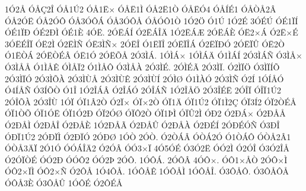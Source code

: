{1^^d32^^c5
^^d3^^c5^^c72^^ce
^^d3^^c51^^da2
^^d3^^c51^^cb^^d7
^^d3^^c5^^cb1^^cc
^^d3^^c52^^cb1^^d2
^^d3^^c5^^cb^^d34
^^d3^^c5^^cd^^c91
^^d3^^c5^^d2^^c52^^c2
^^d3^^c52^^d3^^cb
^^d3^^c52^^d3^^d4
^^d3^^c53^^d3^^d4^^c1
^^d3^^c53^^d3^^d4^^c5
^^d3^^c5^^d3^^d41^^d2
1^^d32^^d6
^^d31^^da
1^^d32^^c9
3^^d3^^c9^^da
^^d3^^c91^^cf^^cd
^^d3^^c91^^cf^^d0
^^d3^^c92^^d0^^cc
^^d3^^c91^^c8
4^^d3^^cb.
2^^d3^^cb^^c1^^cd
^^d32^^cb^^c1^^ce^^c4
1^^d32^^cb^^c1^^c6
2^^d3^^cb^^c1^^c8
^^d3^^cb2^^d7^^c1
^^d32^^cb^^d7^^c9
3^^d3^^cb^^c9^^ce^^cf
^^d3^^cb2^^cc
^^d32^^cb^^cc^^d1
^^d3^^cb3^^cc^^d1^^d7
2^^d3^^cb^^ce
^^d31^^cb^^cf^^ce
2^^d3^^cb^^cf^^ce^^c1
^^d32^^cb^^cf^^d0^^d3
2^^d3^^cb^^cf^^db
^^d3^^cb2^^d2
^^d31^^cb^^d2^^c1
2^^d3^^cb^^d2^^c9^^c2
^^d3^^cb1^^d3
2^^d3^^cb^^d5^^c5
2^^d33^^cc^^c1.
1^^d3^^cc^^c1^^d7
1^^d3^^cc^^c1^^c4
^^d31^^cc^^c1^^cd
2^^d33^^cc^^c1^^d1
^^d33^^cc^^c5^^d7
^^d33^^cc^^c5^^c5
^^d31^^cc^^c5^^ca
^^d3^^cc^^c5^^cf2
^^d31^^cc^^c5^^d4
^^d33^^cc^^c5^^c0
2^^d33^^cc^^c9.
2^^d3^^cc^^c9^^c3
2^^d33^^cc^^cf.
^^d32^^cc^^cf^^d6
^^d33^^cc^^cf^^cd^^d5
2^^d33^^cc^^cf^^d3
2^^d33^^cc^^d5^^c0
2^^d33^^cc^^d9^^c5
2^^d33^^cc^^d9^^ca
2^^d33^^cc^^d9^^cd
2^^d3^^cc^^d8
^^d31^^cc^^c0^^d3
2^^d33^^cc^^d1
^^d32^^cd
1^^d3^^cd^^c5^^d3
^^d34^^cd^^c5^^d1
^^d33^^cd^^d5^^d2
^^d31^^ce
1^^d32^^ce^^c1^^c2
^^d32^^ce^^c1^^d3
2^^d3^^ce^^c1^^d1
1^^d32^^ce^^c5^^d6
2^^d33^^ce^^c9^^cb
2^^d3^^ce^^cf
^^d3^^ce^^cf1^^da2
2^^d3^^ce^^d5^^c0
2^^d33^^ce^^d9
1^^d3^^cf
^^d3^^cf1^^c22^^d2
^^d32^^cf^^d7
^^d3^^cf^^d72^^d2
^^d3^^cf1^^c4
^^d3^^cf1^^da2
^^d3^^cf1^^cc2^^c7
^^d3^^cf3^^cd2
^^d3^^cf2^^d2^^c9^^c5
^^d3^^cf1^^d2^^d5
^^d3^^cf1^^d3^^cb
^^d3^^cf1^^d32^^d0
^^d3^^cf2^^d3^^d8
^^d3^^cf^^d42^^d2
^^d3^^cf1^^de^^cc
^^d3^^cf^^db2^^cc
^^d3^^d02
^^d32^^d0^^c1^^d7
^^d32^^d0^^c5^^c5
^^d32^^d0^^c5^^cc
^^d32^^d0^^c5^^ce
^^d32^^d0^^c5^^c8
1^^d32^^d0^^c5^^c3
^^d32^^d0^^c5^^db
^^d32^^d0^^c5^^c0
^^d32^^d0^^c9^^cd
2^^d3^^d0^^c9^^d3^^d1
^^d33^^d0^^ce
^^d3^^d0^^cf1^^da2
2^^d3^^d0^^cf^^cc
^^d32^^d0^^cf^^d3
2^^d3^^d0^^d8
1^^d3^^d2
2^^d3^^d2.
^^d32^^d2^^c1^^c2
^^d3^^d2^^c12^^d3
^^d31^^d2^^c1^^d4
^^d3^^d2^^c52^^c21
^^d3^^d2^^c53^^c4^^cf
2^^d31^^d3
^^d3^^d3^^c1^^ce^^c42
^^d32^^d3^^c2
^^d3^^d33^^d7^^cf
4^^d35^^d3^^c9
^^d33^^d32^^cb
^^d3^^d32^^cc
^^d32^^d3^^ce
^^d33^^d32^^ce^^c5
^^d32^^d3^^cf^^d2^^c9
^^d3^^d32^^d0
^^d3^^d3^^d42
^^d3^^d32^^de
2^^d3^^d4.
1^^d3^^d4^^c1.
2^^d3^^d4^^c2
4^^d3^^d4^^d7.
^^d3^^d41^^d7^^c5^^d2
2^^d3^^d4^^d7^^cc
^^d3^^d42^^d7^^cf^^cc
^^d3^^d42^^d7^^d1
^^d32^^d4^^c5
1^^d34^^d4^^c5.
1^^d3^^d4^^c5^^ca
1^^d3^^d4^^c5^^cc
1^^d3^^d4^^c5^^ce.
^^d33^^d4^^c5^^d4.
^^d33^^d4^^c5^^d4^^c5
^^d3^^d4^^c53^^c8
^^d33^^d4^^c5^^db
1^^d3^^d4^^c9
^^d32^^d4^^c9^^c5
}
